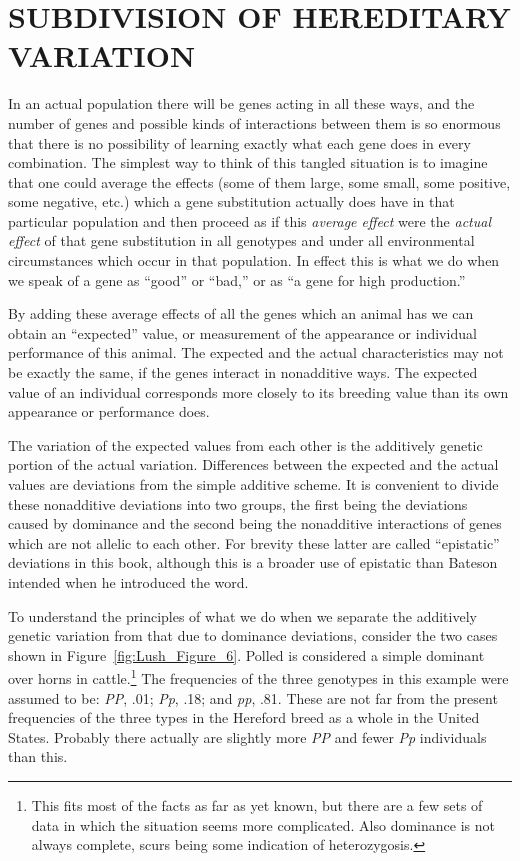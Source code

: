 \section*{SUBDIVISION OF HEREDITARY VARIATION}

In an actual population there will be genes acting in all these ways,
and the number of genes and possible kinds of interactions between
them is so enormous that there is no possibility of learning exactly
what each gene does in every combination. The simplest way to think
of this tangled situation is to imagine that one could average the effects
(some of them large, some small, some positive, some negative, etc.)
which a gene substitution actually does have in that particular population
and then proceed as if this \textit{average effect} were the \textit{actual
effect} of that gene substitution in all genotypes and under all environmental
circumstances which occur in that population. In effect this is what we do
when we speak of a gene as ``good'' or ``bad,'' or as ``a gene for high
production.''

By adding these average effects of all the genes which an animal has
we can obtain an ``expected'' value, or measurement of the appearance
or individual performance of this animal. The expected and the actual
characteristics may not be exactly the same, if the genes interact in
nonadditive ways. The expected value of an individual corresponds more
closely to its breeding value than its own appearance or performance
does.

The variation of the expected values from each other is the additively
genetic portion of the actual variation. Differences between the
expected and the actual values are deviations from the simple additive
scheme. It is convenient to divide these nonadditive deviations into two
groups, the first being the deviations caused by dominance and the second
being the nonadditive interactions of genes which are not allelic
to each other. For brevity these latter are called ``epistatic'' deviations
in this book, although this is a broader use of epistatic than Bateson
intended when he introduced the word.

To understand the principles of what we do when we separate the
additively genetic variation from that due to dominance deviations,
consider the two cases shown in Figure~\ref{fig:Lush_Figure_6}. Polled is
considered a simple dominant over horns in cattle.\footnote{This fits most
of the facts as far as yet known, but there are a few sets of data in which
the situation seems more complicated. Also dominance is not always complete,
scurs being some indication of heterozygosis.} The frequencies of the three
genotypes in this example were assumed to be: \textit{PP}, .01; \textit{Pp},
.18; and \textit{pp}, .81. These are not far from the present frequencies of
the three types in the Hereford breed as a whole in the United States.
Probably there actually are slightly more \textit{PP} and fewer \textit{Pp}
individuals than this.

